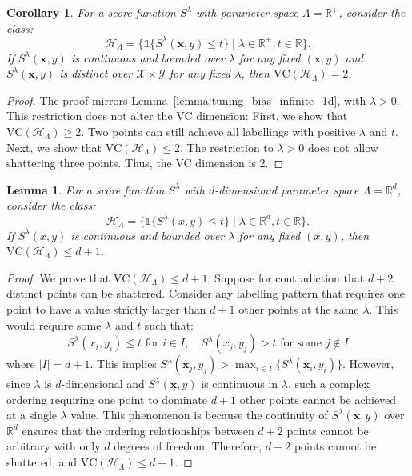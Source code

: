 \documentclass{article}
\newcommand{\1}{\mathbbm{1}}
\newcommand{\id}[1]{\mathds{1}\{#1\}}
\theoremstyle{plain}
\newtheorem{lemma}[theorem]{Lemma}
\newtheorem{corollary}[theorem]{Corollary}
\theoremstyle{definition}
\theoremstyle{remark}
\begin{document}
\begin{corollary}
    \label{corollary:tuning_bias_positive}
    For a score function $S^\lambda$ with parameter space $\Lambda = \mathbb{R}^+$, consider the class:
    \[
    \mathcal{H}_{\Lambda} = \{\id{S^\lambda(\boldsymbol{x},y)\le t} \mid \lambda\in \mathbb{R}^+, t\in \mathbb{R}\}.
    \]
    If $S^\lambda(\boldsymbol{x},y)$ is continuous and bounded over $\lambda$ for any fixed $(\boldsymbol{x},y)$ and $S^\lambda(\boldsymbol{x},y)$ is distinct over \(\mathcal{X} \times \mathcal{Y}\) for any fixed $\lambda$, then $\text{VC}(\mathcal{H}_{\Lambda}) = 2$.
\end{corollary}

\begin{proof}
The proof mirrors Lemma~\ref{lemma:tuning_bias_infinite_1d}, with $\lambda > 0$. This restriction does not alter the VC dimension:
First, we show that $\text{VC}(\mathcal{H}_{\Lambda}) \ge 2$. Two points can still achieve all labellings with positive $\lambda$ and $t$.
Next, we show that $\text{VC}(\mathcal{H}_{\Lambda}) \le 2$. The restriction to $\lambda > 0$ does not allow shattering three points.
Thus, the VC dimension is 2.
\end{proof}

\begin{lemma}
    \label{lemma:tuning_bias_infinite_d}
    For a score function $S^\lambda$ with $d$-dimensional parameter space $\Lambda = \mathbb{R}^d$, consider the class:
    \[
    \mathcal{H}_{\Lambda} = \{\id{S^\lambda(x,y)\le t} \mid \lambda\in \mathbb{R}^d, t\in \mathbb{R}\}.
    \]
    If $S^\lambda(x,y)$ is continuous and bounded over $\lambda$ for any fixed $(x,y)$, then $\text{VC}(\mathcal{H}_{\Lambda}) \leq d+1$.
\end{lemma}

\begin{proof}
We prove that $\text{VC}(\mathcal{H}_{\Lambda}) \le d+1$. Suppose for contradiction that $d+2$ distinct points can be shattered. Consider any labelling pattern that requires one point to have a value strictly larger than $d+1$ other points at the same $\lambda$. This would require some $\lambda$ and $t$ such that:
\[
S^\lambda(x_i,y_i)\le t \text{ for } i\in I, \quad S^\lambda(x_j,y_j)> t \text{ for some } j\notin I
\]
where $|I|=d+1$. This implies $S^\lambda(\boldsymbol{x}_j,y_j)>\max_{i\in I}\{S^\lambda(\boldsymbol{x}_i,y_i)\}$. 
However, since $\lambda$ is $d$-dimensional and $S^\lambda(\boldsymbol{x},y)$ is continuous in $\lambda$, such a complex ordering requiring one point to dominate $d+1$ other points cannot be achieved at a single $\lambda$ value. 
This phenomenon is because the continuity of $S^\lambda(\boldsymbol{x},y)$ over $\mathbb{R}^d$ ensures that the ordering relationships between $d+2$ points cannot be arbitrary with only $d$ degrees of freedom. Therefore, $d+2$ points cannot be shattered, and $\text{VC}(\mathcal{H}_{\Lambda}) \le d+1$.
\end{proof}
\end{document}
